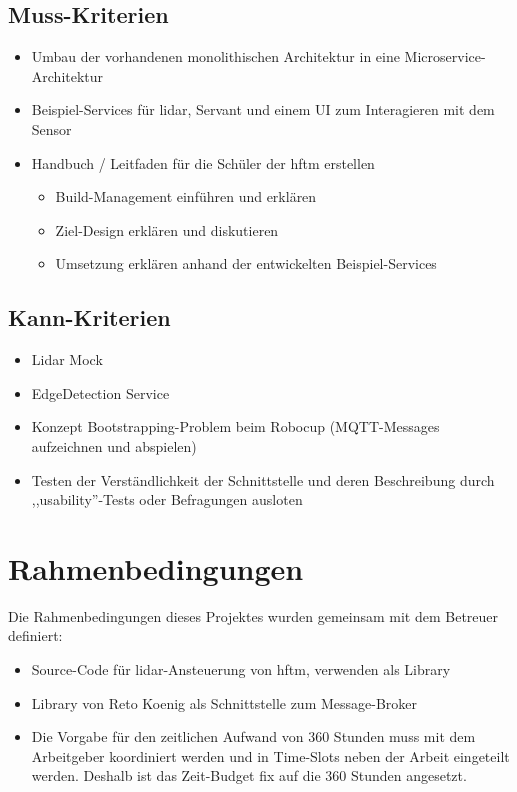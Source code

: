 \subsection{Muss-Kriterien}
\begin{itemize}
	\item Umbau der vorhandenen monolithischen Architektur in eine Microservice-Architektur
	\item Beispiel-Services für \acrshort{lidar}, Servant und einem UI zum Interagieren mit dem Sensor
	\item Handbuch / Leitfaden für die Schüler der \acrshort{hftm} erstellen
	\begin{itemize}
		\item Build-Management einführen und erklären
		\item Ziel-Design erklären und diskutieren
		\item Umsetzung erklären anhand der entwickelten Beispiel-Services
	\end{itemize}
\end{itemize}

\subsection{Kann-Kriterien}
\begin{itemize}
	\item Lidar Mock
	\item EdgeDetection Service
	\item Konzept Bootstrapping-Problem beim Robocup (MQTT-Messages aufzeichnen und abspielen)
	\item Testen der Verständlichkeit der Schnittstelle und deren Beschreibung durch ,,usability''-Tests oder Befragungen ausloten
\end{itemize}

\section{Rahmenbedingungen}
Die Rahmenbedingungen dieses Projektes wurden gemeinsam mit dem Betreuer definiert:
\begin{itemize}
	\item Source-Code für \acrshort{lidar}-Ansteuerung von \acrshort{hftm}, verwenden als Library
	\item Library  \cite{ch.quantasy.mqtt.gateway} von Reto Koenig als Schnittstelle zum Message-Broker
	\item Die Vorgabe für den zeitlichen Aufwand von 360 Stunden muss mit dem Arbeitgeber koordiniert werden und in Time-Slots neben der Arbeit eingeteilt werden. Deshalb ist das Zeit-Budget fix auf die 360 Stunden angesetzt.
\end{itemize}


